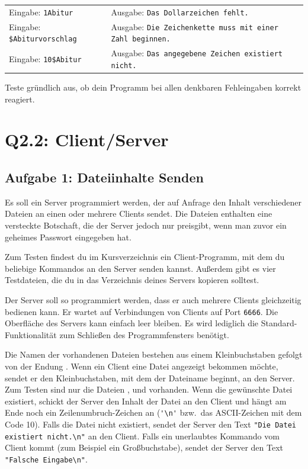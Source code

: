 \bgroup
\def\arraystretch{1.2}
\begin{tabularx}{\textwidth}{p{50mm} X}
Eingabe: \lstinline|1Abitur| &
Ausgabe: \lstinline|Das Dollarzeichen fehlt.| \\
Eingabe: \lstinline|$Abiturvorschlag| &
Ausgabe: \lstinline|Die Zeichenkette muss mit einer Zahl beginnen.| \\
Eingabe: \lstinline|10$Abitur| &
Ausgabe: \lstinline|Das angegebene Zeichen existiert nicht.| \\
\end{tabularx}
\egroup

Teste gründlich aus, ob dein Programm bei allen denkbaren Fehleingaben korrekt reagiert.


\section{Q2.2: Client/Server}

\subsection{Aufgabe 1: Dateiinhalte Senden}

Es soll ein Server programmiert werden, der auf Anfrage den Inhalt
verschiedener Dateien an einen oder mehrere Clients sendet. Die Dateien
enthalten eine versteckte Botschaft, die der Server jedoch nur preisgibt, wenn
man zuvor ein geheimes Passwort eingegeben hat.

Zum Testen findest du im Kursverzeichnis ein Client-Programm, mit dem du
beliebige Kommandos an den Server senden kannst. Außerdem gibt es vier
Testdateien, die du in das Verzeichnis deines Servers kopieren solltest.

Der Server soll so programmiert werden, dass er auch mehrere Clients
gleichzeitig bedienen kann. Er wartet auf Verbindungen von Clients auf Port
\lstinline|6666|. Die Oberfläche des Servers kann einfach leer bleiben. Es wird
lediglich die Standard-Funktionalität zum Schließen des Programmfensters
benötigt.

Die Namen der vorhandenen Dateien bestehen aus einem Kleinbuchstaben gefolgt
von der Endung . Wenn ein Client eine Datei angezeigt bekommen
möchte, sendet er den Kleinbuchstaben, mit dem der Dateiname beginnt, an den
Server. Zum Testen sind nur die Dateien ,  und
 vorhanden. Wenn die gewünschte Datei existiert, schickt der
Server den Inhalt der Datei an den Client und hängt am Ende noch ein
Zeilenumbruch-Zeichen an (\lstinline|'\n'| bzw.\ das ASCII-Zeichen mit dem Code
10). Falls die Datei nicht existiert, sendet der Server den Text 
\lstinline|"Die Datei existiert nicht.\n"| an den Client. Falls ein unerlaubtes
Kommando vom Client kommt (zum Beispiel ein Großbuchstabe), sendet der Server
den Text \lstinline|"Falsche Eingabe\n"|.

